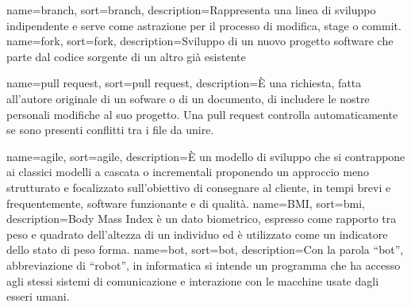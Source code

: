 
\renewcommand{\acronymname}{Acronimi e abbreviazioni}



\renewcommand{\glsnamefont}[1]{\makefirstuc{#1}}

{
    name=branch,
    sort=branch,
    description={Rappresenta una linea di sviluppo indipendente e serve come astrazione per il processo di modifica,
stage o commit.}
}
{
    name=fork,
    sort=fork,
    description={Sviluppo di un nuovo progetto software che parte dal codice sorgente di un altro già esistente}
}

{
    name=pull request,
    sort=pull request,
    description={È una richiesta, fatta all’autore originale di un sofware o di un documento, di includere le nostre personali modifiche al suo progetto. Una pull request controlla automaticamente se sono presenti conflitti tra i file da unire.}
}

{
    name=agile,
    sort=agile,
    description={È un modello di sviluppo che si contrappone ai classici modelli a cascata o incrementali proponendo un approccio meno strutturato e focalizzato sull'obiettivo di consegnare al cliente, in tempi brevi e frequentemente, software funzionante e di qualità. }
}
{
    name=BMI,
    sort=bmi,
    description={Body Mass Index è un dato biometrico, espresso come rapporto tra peso e quadrato dell'altezza di un individuo ed è utilizzato come un indicatore dello stato di peso forma. }
}
{
    name=bot,
    sort=bot,
    description={Con la parola “bot”, abbreviazione di “robot”, in informatica si intende un programma che ha accesso agli stessi sistemi di comunicazione e interazione con le macchine usate dagli esseri umani.}
}

